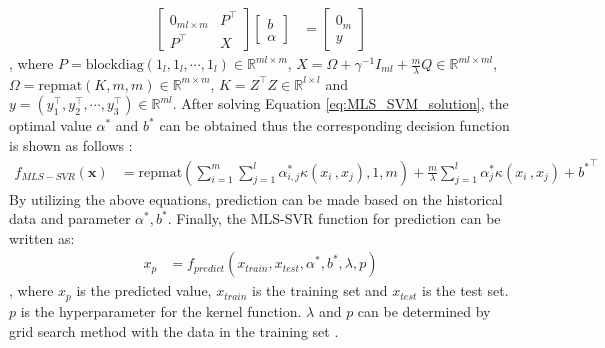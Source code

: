 \begin{align}
    \begin{bmatrix} 0_{ml \times m} & P^{\intercal} \\ P^{\intercal} & X \end{bmatrix} 
    \begin{bmatrix} b \\ \alpha \end{bmatrix} &=
    \begin{bmatrix} 0_m  \\ y \end{bmatrix}
    \label{eq:MLS_SVM_solution}
\end{align}
, where $P=\mathrm{blockdiag} (1_l, 1_l,\cdots, 1_l ) \in \mathbb{R} ^{ml \times m}$, $X=\Omega+ \gamma^{-1} I_{ml}+\frac{m}{\lambda} Q \in \mathbb{R} ^{ml \times ml}$, $\Omega=\mathrm{repmat}( K,m,m) \in \mathbb{R}^{m \times m}$, $K= Z^{\intercal} Z \in \mathbb{R}^{l \times l}$ and $y=(y_1^{\intercal}, y_2^{\intercal},\cdots, y_3^{\intercal}) \in \mathbb{R}^{ml}$. After solving Equation \ref{eq:MLS_SVM_solution}, the optimal value $\alpha^*$ and $b^*$ can be obtained thus the corresponding decision function is shown as follows \cite{xu2013multi}:
\begin{align}
    f_{MLS-SVR}(\mathbf{x}) &= 
     \mathrm{repmat}( \sum_{i=1}^{m} \sum_{j=1}^{l} \alpha_{i,j}^{*} 
                    \kappa({x_i} \,, x_j),1,m)+\frac{m}{\lambda} \sum_{j=1}^{l} \alpha_j^*\kappa({x_i} \,, x_j) +{b^{*}}^{\intercal}
    \label{eq:MLS_SVM_regression}
\end{align}
By utilizing the above equations, prediction can be made based on the historical data and parameter $\alpha^*, b^*$. Finally, the MLS-SVR function for prediction can be written as:
\begin{align}
    x_p &= f_{predict} (x_{train},x_{test},\alpha^*, b^*,\lambda,p)
    \label{eq:MLS_SVM_prediction}
\end{align}
, where $x_p$ is the predicted value, $x_{train}$ is the training set and $x_{test}$ is the test set. $p$ is the hyperparameter for the kernel function. $\lambda$ and $p$ can be determined by grid search method with the data in the training set \cite{xu2013multi}.
